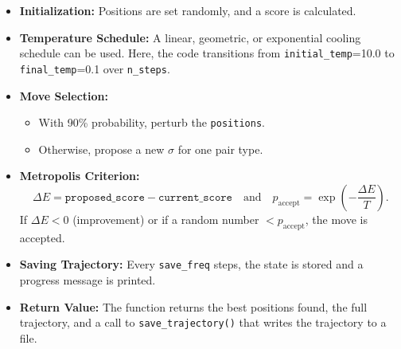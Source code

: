 \documentclass[12pt]{article}
\begin{document}
\begin{itemize}
    \item \textbf{Initialization:} Positions are set randomly, and a score is calculated.
    \item \textbf{Temperature Schedule:} A linear, geometric, or exponential cooling schedule can be used. Here, the code transitions from \texttt{initial\_temp}=10.0 to \texttt{final\_temp}=0.1 over \texttt{n\_steps}.
    \item \textbf{Move Selection:}
        \begin{itemize}
            \item With 90\% probability, perturb the \texttt{positions}.
            \item Otherwise, propose a new $\sigma$ for one pair type.
        \end{itemize}
    \item \textbf{Metropolis Criterion:} 
    \[
        \Delta E = \texttt{proposed\_score} - \texttt{current\_score}
        \quad \text{and} \quad
        p_{\text{accept}} = \exp \left(-\frac{\Delta E}{T}\right).
    \]
    If $\Delta E < 0$ (improvement) or if a random number $< p_{\text{accept}}$, the move is accepted.
    \item \textbf{Saving Trajectory:} Every \texttt{save\_freq} steps, the state is stored and a progress message is printed.
    \item \textbf{Return Value:} The function returns the best positions found, the full trajectory, and a call to \texttt{save\_trajectory()} that writes the trajectory to a file.
\end{itemize}
\end{document}
